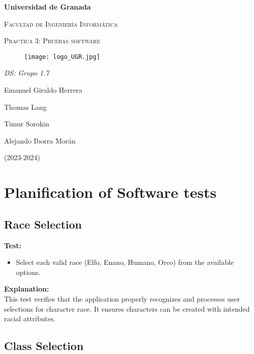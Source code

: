 \documentclass{article}
\begin{document}
    \begin{titlepage}
        \centering
        {\bfseries\LARGE Universidad de Granada\par}
        \vspace{1cm}
        {\scshape\Large Facultad de Ingeniería Informática \par}
        \vspace{2cm}
        {\scshape\Huge Practica 3: Pruebas software \par}
        \begin{figure}[h]
                \centering
                \texttt{[image: logo\_UGR.jpg]}
                \label{fig:portada}
            \end{figure}
        {\itshape\Large DS: Grupo 1.7\par}
        \vfill
            {\Large  Emanuel Giraldo Herrera\par}
            {\Large  Thomas Lang \par}
            {\Large  Timur Sorokin \par}
            {\Large  Alejando Iborra Morán \par}
        \vfill
        {\Large (2023-2024) \par}
    \end{titlepage}

\tableofcontents

\newpage
\section{Planification of Software tests}
\subsection{Race Selection}

\textbf{Test:}
\begin{itemize}
    \item Select each valid race (Elfo, Enano, Humano, Orco) from the available options.
\end{itemize}

\textbf{Explanation:}\\
This test verifies that the application properly recognizes and processes user selections for character race. It ensures characters can be created with intended racial attributes.

\subsection{Class Selection}
\end{document}
